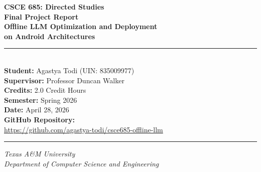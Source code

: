 \documentclass[12pt,letterpaper]{article}
\begin{document}
\begin{titlepage}
    \centering
    \vspace*{1.5cm}
    {\Large\bfseries CSCE 685: Directed Studies\\[0.4em]
    Final Project Report\\[1.2em]}
    {\LARGE\bfseries Offline LLM Optimization and Deployment\\
    on Android Architectures\\[1.5em]}
    \rule{\textwidth}{0.4pt}\\[1em]
    {\large
    \textbf{Student:} Agastya Todi (UIN: 835009977)\\[0.4em]
    \textbf{Supervisor:} Professor Duncan Walker\\[0.4em]
    \textbf{Credits:} 2.0 Credit Hours\\[0.4em]
    \textbf{Semester:} Spring 2026\\[0.4em]
    \textbf{Date:} April 28, 2026\\[1.5em]
    }
    \textbf{GitHub Repository:}\\
    \url{https://github.com/agastya-todi/csce685-offline-llm}\\[2em]
    \rule{\textwidth}{0.4pt}
    \vfill
    \textit{Texas A\&M University\\
    Department of Computer Science and Engineering}
\end{titlepage}

\begin{abstract}
\noindent
This report documents the research and implementation work conducted for CSCE~685
(Directed Studies, Spring~2026) on the topic of deploying and optimizing
large language models (LLMs) entirely offline on Android mobile hardware.
The project used the MLC-LLM framework---built on top of Apache TVM---to compile,
quantize, and execute Microsoft Phi-1.5 (1.3~billion parameters) natively on a
mid-range Android device featuring a Qualcomm Snapdragon SoC.
Model weights were converted to INT4 group quantization using the \texttt{q4f16\_1}
scheme, and the compiled library was linked into an Android application via a
Kotlin--JNI--C\texttt{++} bridge.
The deployed system achieved a measured decode throughput of approximately
\textbf{3--4 tokens per second} on the target device, with a time-to-first-token
of approximately 800--1200~ms.
This report is written so that an independent developer could re-implement the
full pipeline from scratch using only this document and the accompanying
repository.
\end{abstract}
\end{document}
